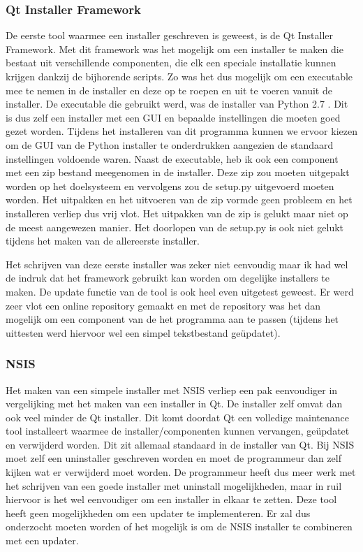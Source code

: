 \documentclass{article}
\begin{document}
\subsubsection{Qt Installer Framework}
De eerste tool waarmee een installer geschreven is geweest, is de Qt Installer Framework.
Met dit framework was het mogelijk om een installer te maken die bestaat uit verschillende componenten, die elk een speciale installatie kunnen krijgen dankzij de bijhorende scripts.
Zo was het dus mogelijk om een executable mee te nemen in de installer en deze op te roepen en uit te voeren vanuit de installer.
De executable die gebruikt werd, was de installer van Python 2.7 .
Dit is dus zelf een installer met een GUI en bepaalde instellingen die moeten goed gezet worden.
Tijdens het installeren van dit programma kunnen we ervoor kiezen om de GUI van de Python installer te onderdrukken aangezien de standaard instellingen voldoende waren.
Naast de executable, heb ik ook een component met een zip bestand meegenomen in de installer.
Deze zip zou moeten uitgepakt worden op het doelsysteem en vervolgens zou de setup.py uitgevoerd moeten worden.
Het uitpakken en het uitvoeren van de zip vormde geen probleem en het installeren verliep dus vrij vlot.
Het uitpakken van de zip is gelukt maar niet op de meest aangewezen manier.
Het doorlopen van de setup.py is ook niet gelukt tijdens het maken van de allereerste installer.

Het schrijven van deze eerste installer was zeker niet eenvoudig maar ik had wel de indruk dat het framework gebruikt kan worden om degelijke installers te maken.
De update functie van de tool is ook heel even uitgetest geweest.
Er werd zeer vlot een online repository gemaakt en met de repository was het dan mogelijk om een component van de het programma aan te passen (tijdens het uittesten werd hiervoor wel een simpel tekstbestand ge\"updatet).

\subsubsection{NSIS}
Het maken van een simpele installer met NSIS verliep een pak eenvoudiger in vergelijking met het maken van een installer in Qt.
De installer zelf omvat dan ook veel minder de Qt installer. 
Dit komt doordat Qt een volledige maintenance tool installeert waarmee de installer/componenten kunnen vervangen, ge\"updatet en verwijderd worden.
Dit zit allemaal standaard in de installer van Qt.
Bij NSIS moet zelf een uninstaller geschreven worden en moet de programmeur dan zelf kijken wat er verwijderd moet worden.
De programmeur heeft dus meer werk met het schrijven van een goede installer met uninstall mogelijkheden, maar in ruil hiervoor is het wel eenvoudiger om een installer in elkaar te zetten.
Deze tool heeft geen mogelijkheden om een updater te implementeren.
Er zal dus onderzocht moeten worden of het mogelijk is om de NSIS installer te combineren met een updater.
\end{document}
